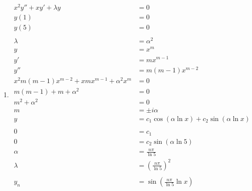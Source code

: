 \documentclass{article}
\begin{document}
\begin{enumerate}
  \item

        \begin{align*}
          x^2 y'' + x y' + \lambda y                             & = 0                                                 \\
          y(1)                                                   & = 0                                                 \\
          y(5)                                                   & = 0                                                 \\ \\
          \lambda                                                & = \alpha^2                                          \\
          y                                                      & = x^m                                               \\
          y'                                                     & = m x^{m - 1}                                       \\
          y''                                                    & = m (m - 1) x^{m - 2}                               \\
          x^2 m (m - 1) x^{m - 2} + x m x^{m - 1} + \alpha^2 x^m & = 0                                                 \\
          m (m - 1) + m + \alpha^2                               & = 0                                                 \\
          m^2 + \alpha^2                                         & = 0                                                 \\
          m                                                      & = \pm i \alpha                                      \\
          y                                                      & = c_1 \cos (\alpha \ln x) + c_2 \sin (\alpha \ln x) \\ \\
          0                                                      & = c_1                                               \\
          0                                                      & = c_2 \sin (\alpha \ln 5)                           \\
          \alpha                                                 & = \frac{n \pi}{\ln 5}                               \\
          \lambda                                                & = \left( \frac{n \pi}{\ln 5} \right)^2              \\ \\
          y_n                                                    & = \sin \left( \frac{n \pi}{\ln 5} \ln x \right)
        \end{align*}


\end{enumerate}
\end{document}
